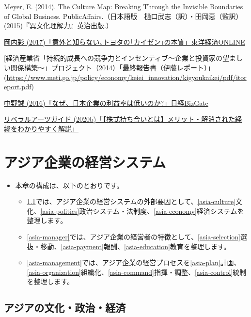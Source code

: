 \documentclass[
]{book}
\begin{document}
Meyer, E. (2014). The Culture Map: Breaking Through the Invisible Boundaries of Global Business. PublicAffairs.（日本語版　樋口武志（訳）・田岡恵（監訳）(2015)『異文化理解力』英治出版.）

\href{https://toyokeizai.net/articles/-/202227}{岡内彩 (2017)「意外と知らない､トヨタの｢カイゼン｣の本質」東洋経済ONLINE}

{[}経済産業省「持続的成長への競争力とインセンティブ～企業と投資家の望ましい関係構築～」プロジェクト（2014）「最終報告書（伊藤レポート）」(\url{https://www.meti.go.jp/policy/economy/keiei_innovation/kigyoukaikei/pdf/itoreport.pdf})

\href{https://bizgate.nikkei.co.jp/article/DGXMZO3110481029052018000000}{中野誠 (2016)「なぜ、日本企業の利益率は低いのか?」日経BizGate}

\href{https://liberal-arts-guide.com/cross-ownership-of-stock/}{リベラルアーツガイド (2020b)「【株式持ち合いとは】メリット・解消された経緯をわかりやすく解説」}

\hypertarget{asia}{%
\chapter{アジア企業の経営システム}\label{asia}}

\begin{itemize}
\item
  本章の構成は、以下のとおりです。

  \begin{itemize}
  \item
    \ref{asia-external}では、アジア企業の経営システムの外部要因として、\ref{asia-culture}文化、\ref{asia-politics}政治システム・法制度、\ref{asia-economy}経済システムを整理します。
  \item
    \ref{asia-manager}では、アジア企業の経営者の特徴として、\ref{asia-selection}選抜・移動、\ref{asia-payment}報酬、\ref{asia-education}教育を整理します。
  \item
    \ref{asia-management}では、アジア企業の経営プロセスを\ref{asia-plan}計画、\ref{asia-organization}組織化、\ref{asia-command}指揮・調整、\ref{asia-control}統制を整理します。
  \end{itemize}
\end{itemize}

\hypertarget{asia-external}{%
\section{アジアの文化・政治・経済}\label{asia-external}}
\end{document}

